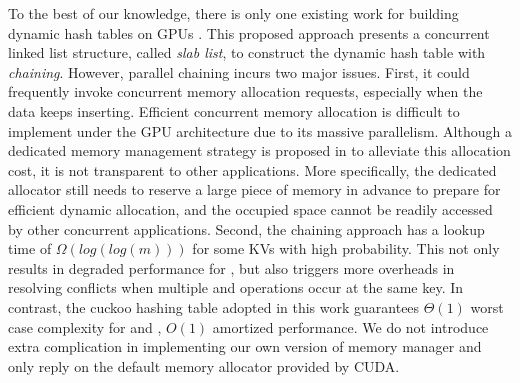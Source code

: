 To the best of our knowledge, there is only one existing work for building dynamic hash tables on GPUs \cite{ashkiani2018dynamic}.
This proposed approach presents a concurrent linked list structure, called \emph{slab list}, to construct the dynamic hash table with \emph{chaining}. 
However, parallel chaining incurs two major issues. 
First, it could frequently invoke concurrent memory allocation requests, especially when the data keeps inserting. Efficient concurrent memory allocation is difficult to implement under the GPU architecture due to its massive parallelism. Although a dedicated memory management strategy is proposed in \cite{ashkiani2018dynamic} to alleviate this allocation cost, it is not transparent to other applications. More specifically, the dedicated allocator still needs to reserve a large piece of memory in advance to prepare for efficient dynamic allocation, and the occupied space cannot be readily accessed by other concurrent applications. 
Second, the chaining approach has a lookup time of $\Omega(log(log(m)))$ for some KVs with high probability. This not only results in degraded performance for , but also triggers more overheads in resolving conflicts when multiple  and  operations occur at the same key.
In contrast, the cuckoo hashing table adopted in this work guarantees $\Theta(1)$ worst case complexity for  and , 
$O(1)$ amortized  performance. We do not introduce extra complication in implementing our own version of memory manager and only reply on the default memory allocator provided by CUDA. 